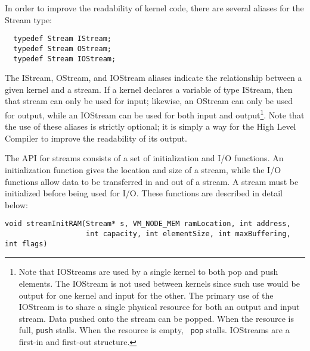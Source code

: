 \clearpage
In order to improve the readability of kernel code, there are several
aliases for the Stream type:
{\small
\begin{verbatim}
  typedef Stream IStream;
  typedef Stream OStream;
  typedef Stream IOStream;
\end{verbatim}}
\noindent The IStream, OStream, and IOStream aliases indicate the
relationship between a given kernel and a stream.  If a kernel
declares a variable of type IStream, then that stream can only be used
for input; likewise, an OStream can only be used for output, while an
IOStream can be used for both input and output\footnote{Note that
IOStreams are used by a single kernel to both pop and push elements.
The IOStream is not used between kernels since such use would be
output for one kernel and input for the other. The primary use of the
IOStream is to share a single physical resource for both an output and
input stream.  Data pushed onto the stream can be popped.  When the
resource is full, {\tt push} stalls.  When the resource is empty, {\tt
pop} stalls.  IOStreams are a first-in and first-out structure.}.
Note that the use of these aliases is strictly optional; it is simply
a way for the High Level Compiler to improve the readability of its
output.

The API for streams consists of a set of initialization and I/O
functions.  An initialization function gives the location and size of
a stream, while the I/O functions allow data to be transferred in and
out of a stream.  A stream must be initialized before being used for
I/O.  These functions are described in detail below:
\makeline
{}
{\small
\begin{verbatim}
void streamInitRAM(Stream* s, VM_NODE_MEM ramLocation, int address, 
                   int capacity, int elementSize, int maxBuffering, int flags)
\end{verbatim}}



